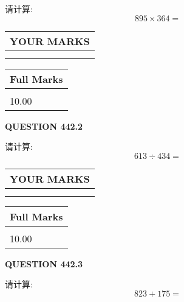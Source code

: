 \documentclass{ctexart}
\begin{document}
  
 
请计算:
\begin{equation}
895  \times    %
364 = \nonumber
\end{equation}
 

 

 
  
\vspace{0.2in}
  
\noindent\begin{tabular}{|l|}
\hline
 YOUR MARKS  \\
\hline
 \\ 
 \\ 
\hline
\end{tabular}
\hspace{0.05in} \begin{tabular}{|l|}
\hline
 Full Marks  \\
\hline
 \\ 
10.00 \\
\hline
\end{tabular}
{\textbf{\Large{QUESTION
442.2 
}}}
  
  
 
请计算:
\begin{equation}
613  \div    %
434 = \nonumber
\end{equation}
 

 

 
  
\vspace{0.2in}
  
\noindent\begin{tabular}{|l|}
\hline
 YOUR MARKS  \\
\hline
 \\ 
 \\ 
\hline
\end{tabular}
\hspace{0.05in} \begin{tabular}{|l|}
\hline
 Full Marks  \\
\hline
 \\ 
10.00 \\
\hline
\end{tabular}
{\textbf{\Large{QUESTION
442.3 
}}}
  
  
 
请计算:
\begin{equation}
823 +  %
175 = \nonumber
\end{equation}
 

 

 
  
\end{document}
